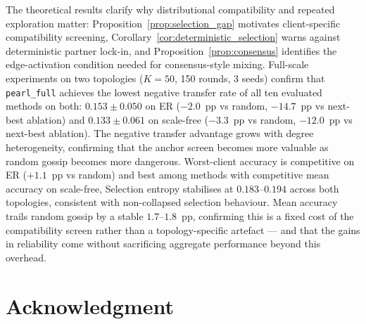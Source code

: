 \documentclass[conference]{IEEEtran}
\newcommand{\rev}[1]{{\color{red}#1}}
\begin{document}
\rev{The theoretical results clarify why distributional compatibility and repeated exploration matter: Proposition~\ref{prop:selection_gap} motivates client-specific compatibility screening, Corollary~\ref{cor:deterministic_selection} warns against deterministic partner lock-in, and Proposition~\ref{prop:consensus} identifies the edge-activation condition needed for consensus-style mixing.} Full-scale experiments on two topologies ($K=50$, 150 rounds, 3 seeds) confirm that \texttt{pearl\_full} achieves the lowest negative transfer rate of all ten evaluated methods on both: $0.153\pm0.050$ on ER ($-2.0$~pp vs random, $-14.7$~pp vs next-best ablation) and $0.133\pm0.061$ on scale-free ($-3.3$~pp vs random, $-12.0$~pp vs next-best ablation). The negative transfer advantage grows with degree heterogeneity, confirming that the anchor screen becomes more valuable as random gossip becomes more dangerous. Worst-client accuracy is competitive on ER ($+1.1$~pp vs random) and best among methods with competitive mean accuracy on scale-free, Selection entropy stabilises at $0.183$--$0.194$ across both topologies, \rev{consistent with non-collapsed selection behaviour}. Mean accuracy trails random gossip by a stable $1.7$--$1.8$~pp, confirming this is a fixed cost of the compatibility screen rather than a topology-specific artefact --- and that the gains in reliability come without sacrificing aggregate performance beyond this overhead.

\section*{Acknowledgment}
\end{document}

